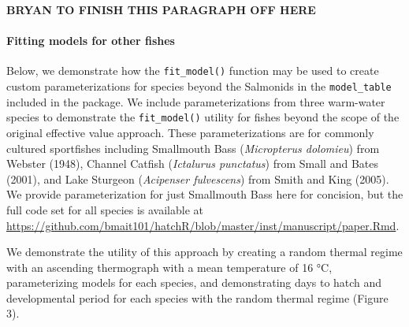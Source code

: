 \documentclass[webpdf,large,contemporary,namedate]{oup-authoring-template}
\theoremstyle{thmstyleone}
\theoremstyle{thmstyletwo}
\theoremstyle{thmstylethree}
\begin{document}
\textbf{BRYAN TO FINISH THIS PARAGRAPH OFF HERE}

\paragraph{Fitting models for other
fishes}\label{fitting-models-for-other-fishes}

Below, we demonstrate how the \texttt{fit\_model()} function may be used
to create custom parameterizations for species beyond the Salmonids in
the \texttt{model\_table} included in the package. We include
parameterizations from three warm-water species to demonstrate the
\texttt{fit\_model()} utility for fishes beyond the scope of the
original effective value approach. These parameterizations are for
commonly cultured sportfishes including Smallmouth Bass
(\emph{Micropterus dolomieu}) from Webster (1948), Channel Catfish
(\emph{Ictalurus punctatus}) from Small and Bates (2001), and Lake
Sturgeon (\emph{Acipenser fulvescens}) from Smith and King (2005). We
provide parameterization for just Smallmouth Bass here for concision,
but the full code set for all species is available at
\url{https://github.com/bmait101/hatchR/blob/master/inst/manuscript/paper.Rmd}.

We demonstrate the utility of this approach by creating a random thermal
regime with an ascending thermograph with a mean temperature of 16 °C,
parameterizing models for each species, and demonstrating days to hatch
and developmental period for each species with the random thermal regime
(Figure 3).
\end{document}
